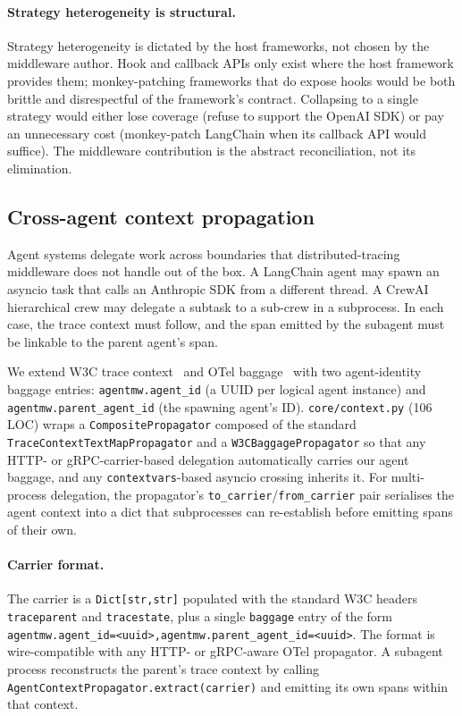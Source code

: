 \documentclass[sigconf,review,anonymous,9pt]{acmart}
\begin{document}
\paragraph{Strategy heterogeneity is structural.}
Strategy heterogeneity is dictated by the host frameworks, not
chosen by the middleware author. Hook and callback APIs only exist
where the host framework provides them; monkey-patching frameworks
that do expose hooks would be both brittle and disrespectful of the
framework's contract. Collapsing to a single strategy would either
lose coverage (refuse to support the OpenAI SDK) or pay an
unnecessary cost (monkey-patch LangChain when its callback API would
suffice). The middleware contribution is the abstract reconciliation,
not its elimination.

\subsection{Cross-agent context propagation}

Agent systems delegate work across boundaries that distributed-tracing
middleware does not handle out of the box. A LangChain agent may
spawn an asyncio task that calls an Anthropic SDK from a different
thread. A CrewAI hierarchical crew may delegate a subtask to a
sub-crew in a subprocess. In each case, the trace context must
follow, and the span emitted by the subagent must be linkable to the
parent agent's span.

We extend W3C trace context~\cite{w3c_tracecontext} and OTel
baggage~\cite{w3c_baggage} with two agent-identity baggage entries:
\texttt{agentmw.agent\_id} (a UUID per logical agent
instance) and \texttt{agentmw.parent\_agent\_id} (the
spawning agent's ID). \texttt{core/context.py} (106 LOC) wraps a
\texttt{CompositePropagator} composed of the standard
\texttt{TraceContextTextMapPropagator} and a
\texttt{W3CBaggagePropagator} so that any HTTP- or gRPC-carrier-based
delegation automatically carries our agent baggage, and any
\texttt{contextvars}-based asyncio crossing inherits it. For
multi-process delegation, the propagator's
\texttt{to\_carrier}/\texttt{from\_carrier} pair serialises the
agent context into a dict that subprocesses can re-establish before
emitting spans of their own.

\paragraph{Carrier format.} The carrier is a \texttt{Dict[str,str]}
populated with the standard W3C headers \texttt{traceparent} and
\texttt{tracestate}, plus a single \texttt{baggage} entry of the
form
\texttt{agentmw.agent\_id=<uuid>,agentmw.parent\_agent\_id=<uuid>}.
The format is wire-compatible with any HTTP- or gRPC-aware OTel
propagator. A subagent process reconstructs the parent's trace
context by calling
\texttt{AgentContextPropagator.extract(carrier)} and emitting its
own spans within that context.
\end{document}
